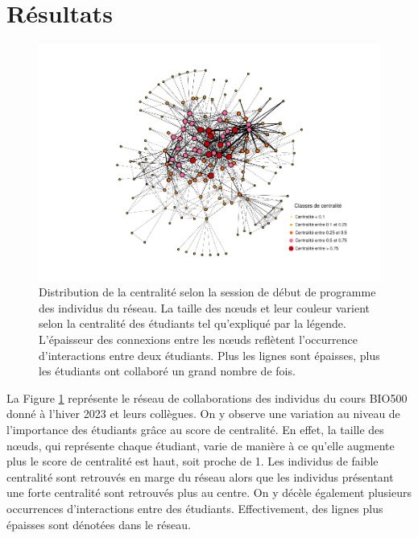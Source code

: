 \documentclass[preprint, 3p,
authoryear]{elsarticle} %
\begin{document}
\hypertarget{ruxe9sultats}{%
\section{Résultats}\label{ruxe9sultats}}

\begin{figure}
\centering
\includegraphics{rapport_files/figure-latex/unnamed-chunk-1-1.pdf}
\caption{\label{fig:plot1}Distribution de la centralité selon la session
de début de programme des individus du réseau. La taille des nœuds et
leur couleur varient selon la centralité des étudiants tel qu'expliqué
par la légende. L'épaisseur des connexions entre les nœuds reflètent
l'occurrence d'interactions entre deux étudiants. Plus les lignes sont
épaisses, plus les étudiants ont collaboré un grand nombre de fois.}
\end{figure}

La Figure \ref{fig:plot1} représente le réseau de collaborations des
individus du cours BIO500 donné à l'hiver 2023 et leurs collègues. On y
observe une variation au niveau de l'importance des étudiants grâce au
score de centralité. En effet, la taille des nœuds, qui représente
chaque étudiant, varie de manière à ce qu'elle augmente plus le score de
centralité est haut, soit proche de 1. Les individus de faible
centralité sont retrouvés en marge du réseau alors que les individus
présentant une forte centralité sont retrouvés plus au centre. On y
décèle également plusieurs occurrences d'interactions entre des
étudiants. Effectivement, des lignes plus épaisses sont dénotées dans le
réseau.
\end{document}

